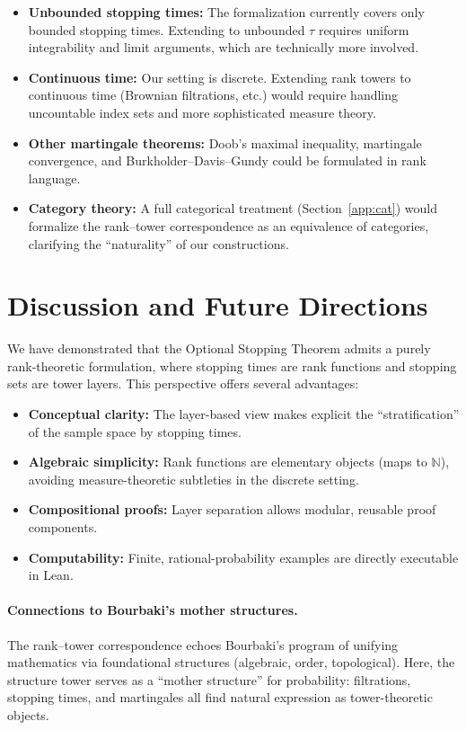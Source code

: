 \documentclass[11pt]{article}
\theoremstyle{definition}
\theoremstyle{remark}
\newcommand{\NN}{\mathbb{N}}
\begin{document}
\begin{itemize}
\item \textbf{Unbounded stopping times:} The formalization currently covers only bounded stopping times.
  Extending to unbounded $\tau$ requires uniform integrability and limit arguments, which are technically more involved.
\item \textbf{Continuous time:} Our setting is discrete.
  Extending rank towers to continuous time (Brownian filtrations, etc.) would require handling uncountable index sets and more sophisticated measure theory.
\item \textbf{Other martingale theorems:} Doob's maximal inequality, martingale convergence, and Burkholder--Davis--Gundy could be formulated in rank language.
\item \textbf{Category theory:} A full categorical treatment (Section~\ref{app:cat}) would formalize the rank--tower correspondence as an equivalence of categories, clarifying the ``naturality'' of our constructions.
\end{itemize}

\section{Discussion and Future Directions}
\label{sec:discussion}

We have demonstrated that the Optional Stopping Theorem admits a purely rank-theoretic formulation, where stopping times are rank functions and stopping sets are tower layers.
This perspective offers several advantages:

\begin{itemize}
\item \textbf{Conceptual clarity:} The layer-based view makes explicit the ``stratification'' of the sample space by stopping times.
\item \textbf{Algebraic simplicity:} Rank functions are elementary objects (maps to $\NN$), avoiding measure-theoretic subtleties in the discrete setting.
\item \textbf{Compositional proofs:} Layer separation allows modular, reusable proof components.
\item \textbf{Computability:} Finite, rational-probability examples are directly executable in Lean.
\end{itemize}

\paragraph{Connections to Bourbaki's mother structures.}
The rank--tower correspondence echoes Bourbaki's program of unifying mathematics via foundational structures (algebraic, order, topological).
Here, the structure tower serves as a ``mother structure'' for probability: filtrations, stopping times, and martingales all find natural expression as tower-theoretic objects.
\end{document}
